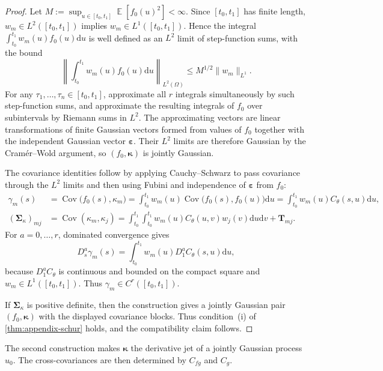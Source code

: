 \documentclass[11pt,a4paper]{article}
\theoremstyle{definition}
\theoremstyle{remark}
\DeclareMathOperator{\E}{\mathbb{E}}
\DeclareMathOperator{\Cov}{Cov}
\begin{document}
\begin{proof}
Let $M:=\sup_{u\in[t_0,t_1]}\E[f_0(u)^2]<\infty$. Since $[t_0,t_1]$ has finite length, $w_m\in L^2([t_0,t_1])$ implies $w_m\in L^1([t_0,t_1])$. Hence the integral $\int_{t_0}^{t_1}w_m(u)f_0(u)\mathrm{d}u$ is well defined as an $L^2$ limit of step-function sums, with the bound
\[
\left\|\int_{t_0}^{t_1}w_m(u)f_0(u)\mathrm{d}u\right\|_{L^2(\Omega)}
\le M^{1/2}\|w_m\|_{L^1}.
\]
For any $\tau_1,\ldots,\tau_n\in[t_0,t_1]$, approximate all $r$ integrals simultaneously by such step-function sums, and approximate the resulting integrals of $f_0$ over subintervals by Riemann sums in $L^2$. The approximating vectors are linear transformations of finite Gaussian vectors formed from values of $f_0$ together with the independent Gaussian vector $\boldsymbol{\varepsilon}$. Their $L^2$ limits are therefore Gaussian by the Cram\'er--Wold argument, so $(f_0,\boldsymbol{\kappa})$ is jointly Gaussian.

The covariance identities follow by applying Cauchy--Schwarz to pass covariance through the $L^2$ limits and then using Fubini and independence of $\boldsymbol{\varepsilon}$ from $f_0$:
\begin{align*}
\gamma_m(s)
&=\Cov\bigl(f_0(s),\kappa_m\bigr)
=\int_{t_0}^{t_1}w_m(u)\Cov\bigl(f_0(s),f_0(u)\bigr)\mathrm{d}u
=\int_{t_0}^{t_1}w_m(u)C_\theta(s,u)\mathrm{d}u,\\
(\boldsymbol{\Sigma}_{\kappa})_{mj}
&=\Cov(\kappa_m,\kappa_j)
=\int_{t_0}^{t_1}\int_{t_0}^{t_1}w_m(u)C_\theta(u,v)w_j(v)\mathrm{d}u\mathrm{d}v+\mathbf{T}_{mj}.
\end{align*}
For $a=0,\ldots,r$, dominated convergence gives
\[
D_s^a\gamma_m(s)=\int_{t_0}^{t_1}w_m(u)D_1^aC_\theta(s,u)\mathrm{d}u,
\]
because $D_1^aC_\theta$ is continuous and bounded on the compact square and $w_m\in L^1([t_0,t_1])$. Thus $\gamma_m\in C^r([t_0,t_1])$.

If $\boldsymbol{\Sigma}_{\kappa}$ is positive definite, then the construction gives a jointly Gaussian pair $(f_0,\boldsymbol{\kappa})$ with the displayed covariance blocks. Thus condition~(i) of \cref{thm:appendix-schur} holds, and the compatibility claim follows.
\end{proof}



The second construction makes \(\boldsymbol{\kappa}\) the derivative jet of a jointly Gaussian process \(u_0\). The cross-covariances are then determined by \(C_{fg}\) and \(C_g\).
\end{document}
